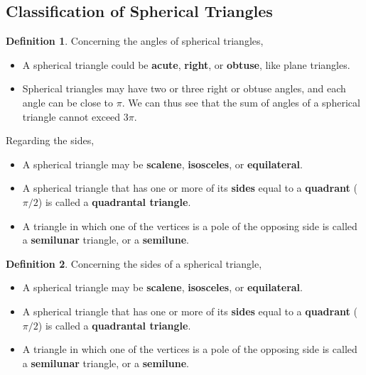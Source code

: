 \documentclass[12pt,a4paper]{memoir}
\theoremstyle{definition}
\newtheorem*{definition}{Definition}
\begin{document}
\subsection{Classification of Spherical Triangles}

\begin{tcolorbox}
	\begin{definition} 
		Concerning the angles of spherical triangles,
		\begin{itemize}
			\item  A spherical triangle could be \textbf{acute}, \textbf{right}, or \textbf{obtuse}, like plane triangles.
			\item Spherical triangles may have two or three right or obtuse angles, and each angle can be close to $\pi$. We can thus see that the sum of angles of a spherical triangle cannot exceed $3\pi$.
		\end{itemize}
		Regarding the sides,
		\begin{itemize}
			\item A spherical triangle may be \textbf{scalene}, \textbf{isosceles}, or \textbf{equilateral}.
			\item A spherical triangle that has one or more of its \textbf{sides} equal to a \textbf{quadrant} ($\pi/2$) is called a \textbf{quadrantal triangle}.
			\item A triangle in which one of the vertices is a pole of the opposing side is called a \textbf{semilunar} triangle, or a \textbf{semilune}.
		\end{itemize}
	\end{definition}
\end{tcolorbox}

\begin{tcolorbox}
	\begin{definition} 
		Concerning the sides of a spherical triangle,
		\begin{itemize}
			\item A spherical triangle may be \textbf{scalene}, \textbf{isosceles}, or \textbf{equilateral}.
			\item A spherical triangle that has one or more of its \textbf{sides} equal to a \textbf{quadrant} ($\pi/2$) is called a \textbf{quadrantal triangle}.
			\item A triangle in which one of the vertices is a pole of the opposing side is called a \textbf{semilunar} triangle, or a \textbf{semilune}.
		\end{itemize}
	\end{definition}
\end{tcolorbox}
\end{document}
